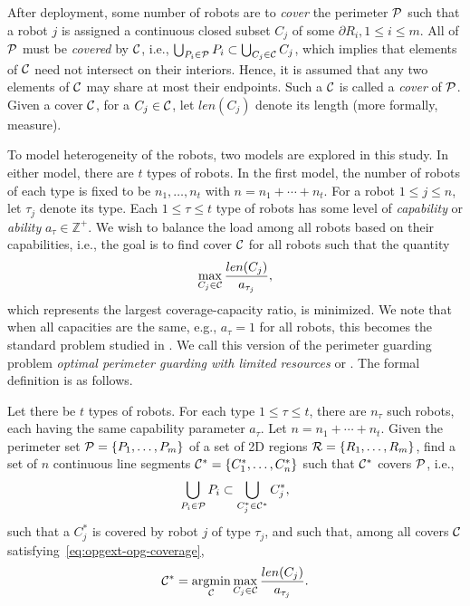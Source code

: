 After deployment, some number of robots are to {\em cover} the perimeter 
$\P$ such that a robot $j$ is assigned a continuous closed subset $C_j$ 
of some $\partial R_i, 1 \le i \le m$. All of $\P$ must be {\em covered} 
by $\C$, i.e., 
%
$\bigcup_{P_i \in \P} P_i  \subset \bigcup_{C_j \in \C} C_j$,
%
which implies that elements of $\C$ need not intersect on their interiors. 
Hence, it is assumed that any two elements of $\C$ may share at most their 
endpoints. Such a $\C$ is called a {\em cover} of $\P$. Given a cover 
$\C$, for a $C_j \in \C$, let $len(C_j)$ denote its length (more formally, 
measure). 

To model heterogeneity of the robots, two models are explored in this
study. In either model, there are $t$ types of robots. In the first model,
the number of robots of each type is fixed to be $n_1, \ldots, n_t$ with 
$n = n_1 + \cdots + n_t$. For a robot $1 \le j \le n$, let $\tau_j$ denote 
its type. Each $1 \le \tau \le t$ type of robots has some 
level of {\em capability} or {\em ability} $a_{\tau} \in \mathbb Z^+$. We 
wish to balance the load among all robots based on their capabilities, 
i.e., the goal is to find cover $\C$ for all robots such that the quantity 
\[
\max_{C_j \in \C} \frac{len(C_j)}{a_{\tau_j}},
\]
which represents the largest coverage-capacity ratio, is minimized. 
We note that when all capacities are the same, e.g., $a_{\tau} = 1$ for 
all robots, this becomes the standard \opg problem studied in \cite{fenghangaoyu2019efficient}. 
We call this version of the perimeter guarding problem {\em optimal 
	perimeter guarding with limited resources} or \opglr. The formal 
definition is as follows.

\begin{problem} Let there be $t$ types of robots. For each type $1\le \tau 
	\le t$, there are $n_{\tau}$ such robots, each having the same 
	capability parameter $a_{\tau}$. Let $n = n_1 + \cdots + n_t$. 
	Given the perimeter set $\P = \{P_1, \ldots, P_m\}$ of a set of 
	2D regions $\R =\{R_1, \ldots, R_m\}$, find a set of $n$ continuous 
	line segments $\C^* = \{C_1^*, \ldots, C_n^*\}$ such that $\C^*$ covers 
	$\P$, i.e., \begin{align}\label{eq:opgext-opg-coverage}
	\bigcup_{P_i \in \P} P_i  \subset \bigcup_{C_j^* \in \C^*} C_j^*,
	\end{align}
	such that a $C_j^*$ is covered by robot $j$ of type $\tau_j$, and such that,
	among all covers $\C$ satisfying~\eqref{eq:opgext-opg-coverage}, 
	\begin{align}\label{eq:opgext-opg-objective}
	\C^* = \underset{\C}{\mathrm{argmin}} \max_{C_j \in \C} 
	\frac{len(C_j)}{a_{\tau_j}}.
	\end{align}
\end{problem}

